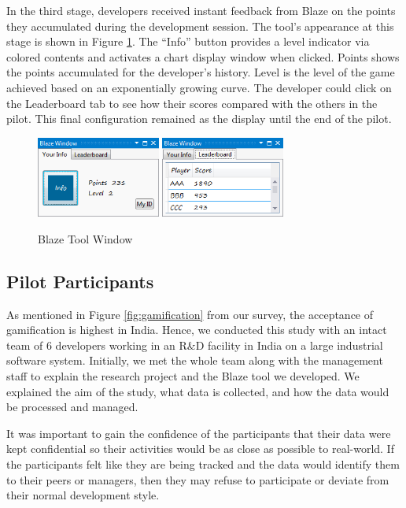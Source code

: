 \documentclass{sig-alternate}
\begin{document}
In the third stage, developers received instant feedback from Blaze on the points they accumulated during the development session.  The tool's appearance at this stage is shown in Figure \ref{fig:blazeWindow}.  The ``Info'' button provides a level indicator via colored contents and activates a chart display window when clicked.  Points shows the points accumulated for the developer's history.  Level is the level of the game achieved based on an exponentially growing curve.   The developer could click on the Leaderboard tab to see how their scores compared with the others in the pilot.  This final configuration remained as the display until the end of the pilot.  

\begin{figure}
	\centering
	\includegraphics[width=1.6in]{blazeWindow.png}
\includegraphics[width=1.6in]{blazeLeaderboard.png}
	\caption{Blaze Tool Window}
	\label{fig:blazeWindow}
\end{figure}


\subsection{Pilot Participants}

As mentioned in Figure \ref{fig:gamification} from our survey, the acceptance of gamification is highest in India. Hence, we conducted this study with an intact team of 6 developers working in an R\&D facility in India on a large industrial software system. Initially, we met the whole team along with the management staff to explain the research project and the Blaze tool we developed. We  explained the aim of the study, what data is collected, and how the data would be processed and managed. 

It was important to gain the confidence of the participants that their data were kept confidential so their activities would be as close as possible to real-world. If the participants felt like they are being tracked and the data would identify them to their peers or managers, then they may refuse to participate or deviate from their normal development style.
\end{document}
